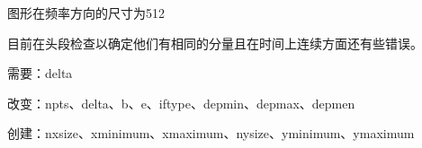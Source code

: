 图形在频率方向的尺寸为512

目前在头段检查以确定他们有相同的分量且在时间上连续方面还有些错误。

需要：delta

改变：npts、delta、b、e、iftype、depmin、depmax、depmen

创建：nxsize、xminimum、xmaximum、nysize、yminimum、ymaximum
